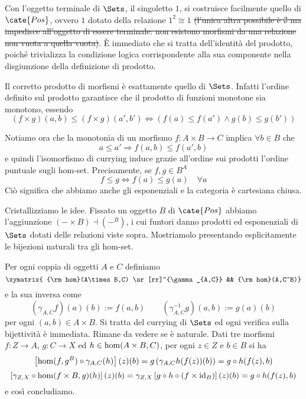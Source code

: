 
Con l'oggetto terminale di $\Sets$, il singoletto $1$, si costruisce facilmente quello di $\cate{Pos}$, ovvero $1$ dotato della relazione $1^2\cong 1$ \sout{(l'unica altra possibile è $\emptyset$ ma impedisce all'oggetto di essere terminale: non esistono morfismi da una relazione non vuota a quella vuota)}. È immediato che si tratta dell'identità del prodotto, poiché trivializza la condizione logica corrispondente alla sua componente nella disgiunzione della definizione di prodotto.


Il corretto prodotto di morfismi è esattamente quello di $\Sets$. Infatti l'ordine definito sul prodotto garantisce che il prodotto di funzioni monotone sia monotono, essendo
\[(f\times g)(a,b)\leq(f\times g)(a',b')\Leftrightarrow(f(a)\leq f(a')\wedge g(b)\leq g(b'))\]

Notiamo ora che la monotonia di un morfismo $f:A\times B\rightarrow C$ implica $\forall b\in B$ che
\[a\leq a' \Rightarrow f(a,b)\leq f(a',b)\]
e quindi l'isomorfismo di currying induce grazie all'ordine sui prodotti l'ordine puntuale sugli hom-set. Precisamente, se $f,g\in B^A$
\[f\leq g \Leftrightarrow f(a)\leq g(a) \quad \forall a\]
Ciò significa che abbiamo anche gli esponenziali e la categoria è cartesiana chiusa.

Cristallizziamo le idee. Fissato un oggetto $B$ di $\cate{Pos}$ abbiamo l'aggiunzione $(-\times B)\dashv(-^B)$, i cui funtori danno prodotti ed esponenziali di $\Sets$ dotati delle relazioni viste sopra. Mostriamolo presentando esplicitamente le bijezioni naturali tra gli hom-set.

Per ogni coppia di oggetti $A$ e $C$ definiamo
\[
\xymatrix{ {\rm hom}(A\times B,C)
\ar[rr]^{\gamma_{A,C}} &&
{\rm hom}(A,C^B)}
\]
e la sua inversa come
\[
(\gamma_{A,C}f)(a)(b):=f(a,b)
\qquad
(\gamma_{A,C}^{-1}g)(a,b):=g(a)(b)
\]
per ogni $(a,b)\in A\times B$. Si tratta del currying di $\Sets$ ed ogni verifica sulla bijettività è immediata. Rimane da vedere se è naturale. Dati tre morfismi $f:Z\rightarrow A$, $g:C\rightarrow X$ ed $h\in{\rm hom}(A\times B,C)$, per ogni $z\in Z$ e $b\in B$ si ha
\[
\left[ {\rm hom}(f,g^B) \circ \gamma_{A,C} (h) \right] (z)(b) = 
g\left(\gamma_{A,C}h(f(z))(b)\right) = 
g\circ h(f(z),b)
\]
\[
\left[ \gamma_{Z,X}\circ{\rm hom}(f\times B,g) (h) \right] (z)(b) =
\gamma_{Z,X} \left[ g\circ h\circ(f\times{\rm id}_B) \right] (z)(b)=
g\circ h(f(z),b)
\]
e così concludiamo.


